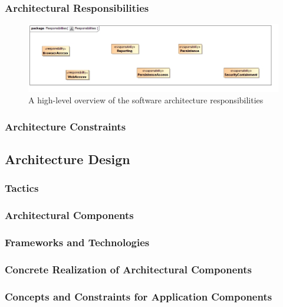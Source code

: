 \subsubsection{Architectural Responsibilities}
\begin{figure}[H]
	\begin{center}
	\includegraphics[scale=0.4]{../Diagrams and Charts/Architecture/Responsibilities.jpg}
	\caption{A high-level overview of the software architecture responsibilities}
	\end{center}
	\label{ref:architectureResponsibilities}
\end{figure}

\subsubsection{Architecture Constraints}

\subsection{Architecture Design}
\subsubsection{Tactics}
\subsubsection{Architectural Components}
\subsubsection{Frameworks and Technologies}
\subsubsection{Concrete Realization of Architectural Components}
\subsubsection{Concepts and Constraints for Application Components}


